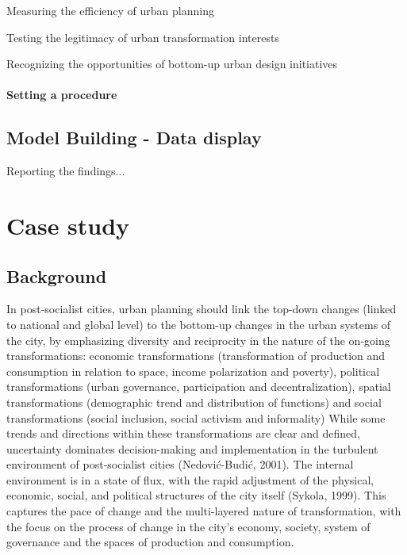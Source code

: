\documentclass[11pt]{report}
\begin{document}
Measuring the efficiency of urban planning

Testing the legitimacy of urban transformation interests

Recognizing the opportunities of bottom-up urban design initiatives


\subsubsection{Setting a procedure}

\section{Model Building - Data display}

Reporting the findings...


\chapter{Case study}


\section{Background}
In post-socialist cities, urban planning should link the top-down changes (linked to national and global level) to the bottom-up changes in the urban systems of the city, by emphasizing diversity and reciprocity in the nature of the on-going transformations: economic transformations (transformation of production and consumption in relation to space, income polarization and poverty), political transformations (urban governance, participation and decentralization), spatial transformations (demographic trend and distribution of functions) and social transformations (social inclusion, social activism and informality)
While some trends and directions within these transformations are clear and defined, uncertainty dominates decision-making and implementation in the turbulent environment of post-socialist cities (Nedović-Budić, 2001). The internal environment is in a state of flux, with the rapid adjustment of the physical, economic, social, and political structures of the city itself (Sykola, 1999). This captures the pace of change and the multi-layered nature of transformation, with the focus on the process of change in the city’s economy, society, system of governance and the spaces of production and consumption.
\end{document}
